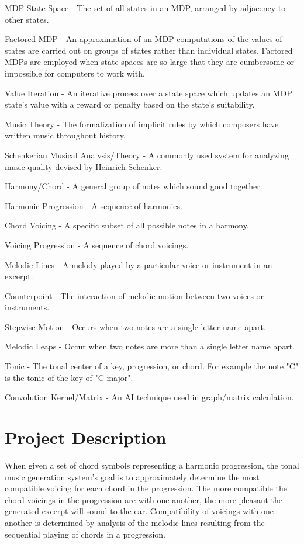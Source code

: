 \documentclass{chi2009}
\begin{document}
MDP State Space - The set of all states in an MDP, arranged by adjacency to other states.

Factored MDP - An approximation of an MDP computations of the values of states are carried out on groups of states rather than individual states.  Factored MDPs are employed when state spaces are so large that they are cumbersome or impossible for computers to work with.

Value Iteration - An iterative process over a state space which updates an MDP state's value with a reward or penalty based on the state's suitability.

Music Theory - The formalization of implicit rules by which composers have written music throughout history.


Schenkerian Musical Analysis/Theory - A commonly used system for analyzing music quality devised by Heinrich Schenker.

Harmony/Chord - A general group of notes which sound good together.  

Harmonic Progression - A sequence of harmonies.

Chord Voicing - A specific subset of all possible notes in a harmony.

Voicing Progression - A sequence of chord voicings.

Melodic Lines - A melody played by a particular voice or instrument in an excerpt.

Counterpoint - The interaction of melodic motion between two voices or instruments.

Stepwise Motion - Occurs when two notes are a single letter name apart.

Melodic Leaps - Occur when two notes are more than a single letter name apart.

Tonic - The tonal center of a key, progression, or chord.  For example the note "C" is the tonic of the key of "C major".

Convolution Kernel/Matrix - An AI technique used in graph/matrix calculation.

\section{Project Description}
When given a set of chord symbols representing a harmonic progression, the tonal music generation system's goal is to approximately determine the most compatible voicing for each chord in the progression.  The more compatible the chord voicings in the progression are with one another, the more pleasant the generated excerpt will sound to the ear.  Compatibility of voicings with one another is determined by analysis of the melodic lines resulting from the sequential playing of chords in a progression. 
\end{document}
